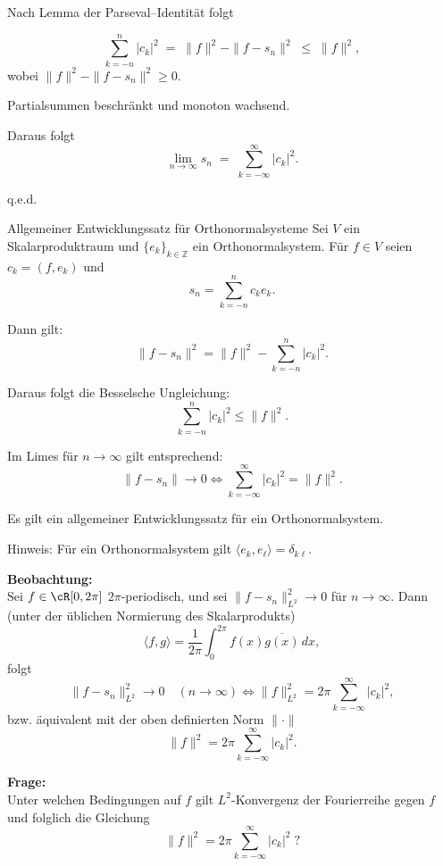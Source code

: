 \begin{beweisbox}
    Nach Lemma der Parseval--Identität folgt

    $$
    \sum_{k=-n}^{n} |c_k|^2 \;=\; \|f\|^2 - \|f-s_n\|^2 \;\le\; \|f\|^2,
    $$
    wobei $\|f\|^2-\|f-s_n\|^2 \ge 0$.

    Partialsummen beschränkt und monoton wachsend.

    Daraus folgt
    $$
    \lim_{n\to\infty} s_n \;=\; \sum_{k=-\infty}^{\infty} |c_k|^2.
    $$

    q.e.d.
\end{beweisbox}

\begin{satz}{Allgemeiner Entwicklungssatz für Orthonormalsysteme}
    Sei $V$ ein Skalarproduktraum und $\{e_k\}_{k\in\mathbb{Z}}$ ein Orthonormalsystem.
    Für $f \in V$ seien $c_k = (f,e_k)$ und
    $$
        s_n = \sum_{k=-n}^{n} c_k e_k.
    $$

    Dann gilt:
    $$
        \|f - s_n\|^2 = \|f\|^2 - \sum_{k=-n}^{n} |c_k|^2.
    $$

    Daraus folgt die Besselsche Ungleichung:
    $$
        \sum_{k=-n}^{n} |c_k|^2 \le \|f\|^2.
    $$

    Im Limes für $n \to \infty$ gilt entsprechend:
    $$
        \|f - s_n\| \to 0 \Leftrightarrow \sum_{k=-\infty}^{\infty} |c_k|^2 = \|f\|^2.
    $$
\end{satz}

\begin{bemerkungbox}
    Es gilt ein allgemeiner Entwicklungssatz für ein Orthonormalsystem.

    Hinweis: Für ein Orthonormalsystem gilt $\langle e_k,e_\ell\rangle=\delta_{k\ell}$.

    \textbf{Beobachtung:}\\
    Sei $f\in \cR[0,2\pi]$ $2\pi$-periodisch, und sei $\|f-s_n\|_{L^2}^2\to 0$ für $n\to\infty$.
    Dann (unter der üblichen Normierung des Skalarprodukts)
    $$
    \langle f,g\rangle = \frac{1}{2\pi}\int_{0}^{2\pi} f(x)\overline{g(x)}\,dx,
    $$
    folgt
    $$
    \|f-s_n\|_{L^2}^2 \to 0 \quad (n\to\infty)
    \iff \|f\|_{L^2}^2 = 2\pi\sum_{k=-\infty}^{\infty} |c_k|^2,
    $$
    bzw. äquivalent mit der oben definierten Norm $\|\cdot\|$
    $$
    \|f\|^2 = 2\pi\sum_{k=-\infty}^{\infty}|c_k|^2.
    $$

    \vspace{6pt}
    \textbf{Frage:}\\
    Unter welchen Bedingungen auf $f$ gilt $L^2$-Konvergenz der Fourierreihe gegen $f$ und folglich die Gleichung
    $$
    \|f\|^2 = 2\pi\sum_{k=-\infty}^{\infty} |c_k|^2\; ?
    $$
\end{bemerkungbox}

